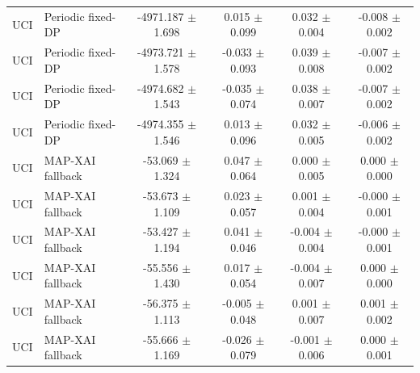 \begin{tabular}{llcccc}
UCI & Periodic fixed-DP & -4971.187 $\pm$ 1.698 & 0.015 $\pm$ 0.099 & 0.032 $\pm$ 0.004 & -0.008 $\pm$ 0.002 \\
UCI & Periodic fixed-DP & -4973.721 $\pm$ 1.578 & -0.033 $\pm$ 0.093 & 0.039 $\pm$ 0.008 & -0.007 $\pm$ 0.002 \\
UCI & Periodic fixed-DP & -4974.682 $\pm$ 1.543 & -0.035 $\pm$ 0.074 & 0.038 $\pm$ 0.007 & -0.007 $\pm$ 0.002 \\
UCI & Periodic fixed-DP & -4974.355 $\pm$ 1.546 & 0.013 $\pm$ 0.096 & 0.032 $\pm$ 0.005 & -0.006 $\pm$ 0.002 \\
UCI & MAP-XAI fallback & -53.069 $\pm$ 1.324 & 0.047 $\pm$ 0.064 & 0.000 $\pm$ 0.005 & 0.000 $\pm$ 0.000 \\
UCI & MAP-XAI fallback & -53.673 $\pm$ 1.109 & 0.023 $\pm$ 0.057 & 0.001 $\pm$ 0.004 & -0.000 $\pm$ 0.001 \\
UCI & MAP-XAI fallback & -53.427 $\pm$ 1.194 & 0.041 $\pm$ 0.046 & -0.004 $\pm$ 0.004 & -0.000 $\pm$ 0.001 \\
UCI & MAP-XAI fallback & -55.556 $\pm$ 1.430 & 0.017 $\pm$ 0.054 & -0.004 $\pm$ 0.007 & 0.000 $\pm$ 0.000 \\
UCI & MAP-XAI fallback & -56.375 $\pm$ 1.113 & -0.005 $\pm$ 0.048 & 0.001 $\pm$ 0.007 & 0.001 $\pm$ 0.002 \\
UCI & MAP-XAI fallback & -55.666 $\pm$ 1.169 & -0.026 $\pm$ 0.079 & -0.001 $\pm$ 0.006 & 0.000 $\pm$ 0.001 \\
\bottomrule
\end{tabular}
